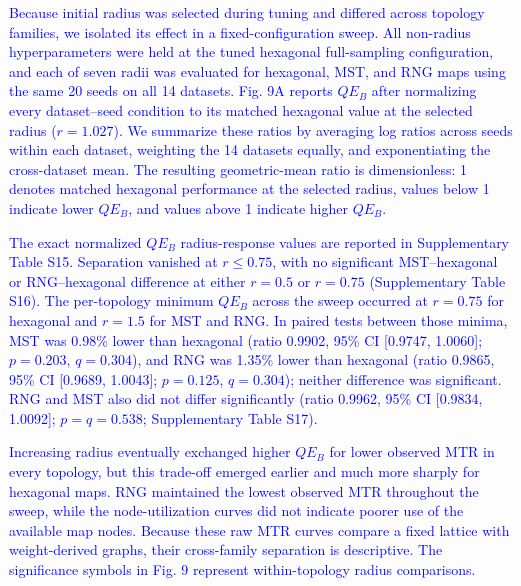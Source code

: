 \documentclass[10pt]{article} %
\newcommand{\TrackedChange}[1]{\textcolor{blue}{#1}}
\begin{document}
\TrackedChange{Because initial radius was selected during tuning and differed across topology families, we isolated its effect in a fixed-configuration sweep.} \TrackedChange{All non-radius hyperparameters were held at the tuned hexagonal full-sampling configuration, and each of seven radii was evaluated for hexagonal, MST, and RNG maps using the same 20 seeds on all 14 datasets.} \TrackedChange{Fig. 9A reports $QE_B$ after normalizing every dataset--seed condition to its matched hexagonal value at the selected radius ($r=1.027$).} \TrackedChange{We summarize these ratios by averaging log ratios across seeds within each dataset, weighting the 14 datasets equally, and exponentiating the cross-dataset mean.} \TrackedChange{The resulting geometric-mean ratio is dimensionless: 1 denotes matched hexagonal performance at the selected radius, values below 1 indicate lower $QE_B$, and values above 1 indicate higher $QE_B$.}

\TrackedChange{The exact normalized $QE_B$ radius-response values are reported in Supplementary Table S15.} \TrackedChange{Separation vanished at $r\leq0.75$, with no significant MST--hexagonal or RNG--hexagonal difference at either $r=0.5$ or $r=0.75$ (Supplementary Table S16).} \TrackedChange{The per-topology minimum $QE_B$ across the sweep occurred at $r=0.75$ for hexagonal and $r=1.5$ for MST and RNG.} \TrackedChange{In paired tests between those minima, MST was 0.98\% lower than hexagonal (ratio 0.9902, 95\% CI [0.9747, 1.0060]; $p=0.203$, $q=0.304$), and RNG was 1.35\% lower than hexagonal (ratio 0.9865, 95\% CI [0.9689, 1.0043]; $p=0.125$, $q=0.304$); neither difference was significant.} \TrackedChange{RNG and MST also did not differ significantly (ratio 0.9962, 95\% CI [0.9834, 1.0092]; $p=q=0.538$; Supplementary Table S17).}

\TrackedChange{Increasing radius eventually exchanged higher $QE_B$ for lower observed MTR in every topology, but this trade-off emerged earlier and much more sharply for hexagonal maps.} \TrackedChange{RNG maintained the lowest observed MTR throughout the sweep, while the node-utilization curves did not indicate poorer use of the available map nodes.} \TrackedChange{Because these raw MTR curves compare a fixed lattice with weight-derived graphs, their cross-family separation is descriptive.} \TrackedChange{The significance symbols in Fig. 9 represent within-topology radius comparisons.}
\end{document}
